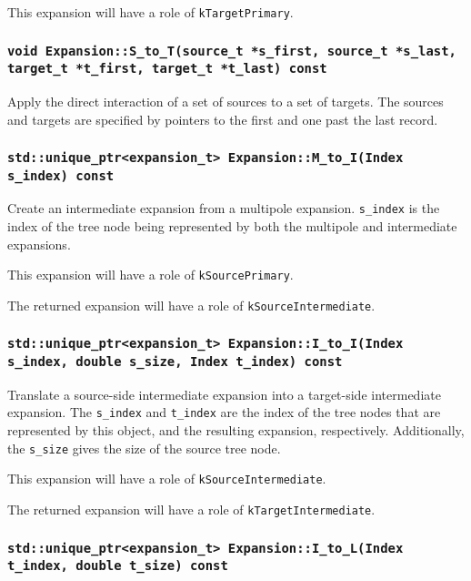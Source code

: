 This expansion will have a role of \texttt{kTargetPrimary}.

\subsubsection{\texttt{void Expansion::S\_to\_T(source\_t *s\_first, source\_t *s\_last, target\_t *t\_first, target\_t *t\_last) const}}

Apply the direct interaction of a set of sources to a set of targets. The
sources and targets are specified by pointers to the first and one past the
last record.

\subsubsection{\texttt{std::unique\_ptr<expansion\_t> Expansion::M\_to\_I(Index s\_index) const}}

Create an intermediate expansion from a multipole expansion. \texttt{s\_index}
is the index of the tree node being represented by both the multipole and
intermediate expansions.

This expansion will have a role of \texttt{kSourcePrimary}.

The returned expansion will have a role of \texttt{kSourceIntermediate}.

\subsubsection{\texttt{std::unique\_ptr<expansion\_t> Expansion::I\_to\_I(Index s\_index, double s\_size, Index t\_index) const}}

Translate a source-side intermediate expansion into a target-side intermediate
expansion. The \texttt{s\_index} and \texttt{t\_index} are the index of the
tree nodes that are represented by this object, and the resulting expansion,
respectively. Additionally, the \texttt{s\_size} gives the size of the source
tree node.

This expansion will have a role of \texttt{kSourceIntermediate}.

The returned expansion will have a role of \texttt{kTargetIntermediate}.

\subsubsection{\texttt{std::unique\_ptr<expansion\_t> Expansion::I\_to\_L(Index t\_index, double t\_size) const}}

